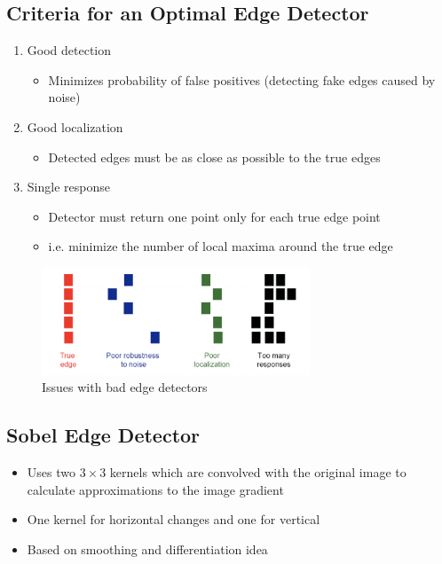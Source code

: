 \documentclass[letterpaper,12pt]{article}
\begin{document}
\subsection{Criteria for an Optimal Edge Detector}
\begin{enumerate}
 \item Good detection
       \begin{itemize}
        \item Minimizes probability of false positives (detecting fake edges caused by noise)
       \end{itemize}
 \item Good localization
       \begin{itemize}
        \item Detected edges must be as close as possible to the true edges
       \end{itemize}
 \item Single response
       \begin{itemize}
        \item Detector must return one point only for each true edge point
        \item i.e. minimize the number of local maxima around the true edge
       \end{itemize}
\end{enumerate}
\begin{figure}[H]
 \centering
 \includegraphics[width=8cm]{images/edge_detectors.png}
 \caption{Issues with bad edge detectors}
\end{figure}

\subsection{Sobel Edge Detector}
\begin{itemize}
 \item Uses two $3 \times 3$ kernels which are convolved with the original image to calculate approximations to the image gradient
 \item One kernel for horizontal changes and one for vertical
 \item Based on smoothing and differentiation idea
\end{itemize}
\end{document}

